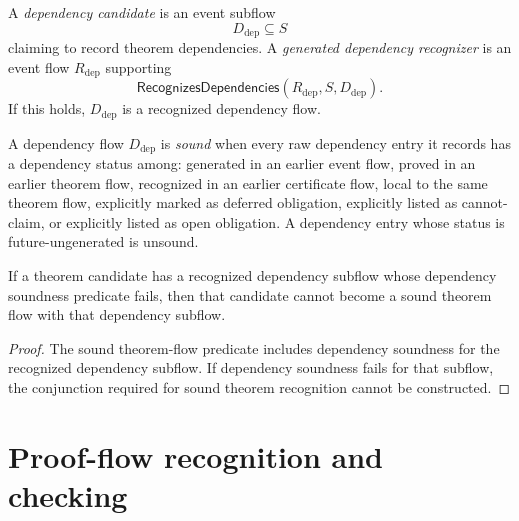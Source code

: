 \begin{definition}
\label{def:theorem-proof-dependency-candidate-recognizer}
A \emph{dependency candidate} is an event subflow
$$
  D_{\mathrm{dep}}\subseteq S
$$
claiming to record theorem dependencies. A \emph{generated dependency recognizer} is an event flow $R_{\mathrm{dep}}$ supporting
$$
  \mathsf{RecognizesDependencies}(R_{\mathrm{dep}},S,D_{\mathrm{dep}}).
$$
If this holds, $D_{\mathrm{dep}}$ is a recognized dependency flow.
\end{definition}

\begin{definition}
\label{def:theorem-proof-dependency-soundness}
A dependency flow $D_{\mathrm{dep}}$ is \emph{sound} when every raw dependency entry it records has a dependency status among: generated in an earlier event flow, proved in an earlier theorem flow, recognized in an earlier certificate flow, local to the same theorem flow, explicitly marked as deferred obligation, explicitly listed as cannot-claim, or explicitly listed as open obligation. A dependency entry whose status is future-ungenerated is unsound.
\end{definition}

\begin{theorem}
\label{thm:theorem-proof-unsound-dependency-blocks}
If a theorem candidate has a recognized dependency subflow whose dependency soundness predicate fails, then that candidate cannot become a sound theorem flow with that dependency subflow.
\end{theorem}

\begin{proof}
The sound theorem-flow predicate includes dependency soundness for the recognized dependency subflow. If dependency soundness fails for that subflow, the conjunction required for sound theorem recognition cannot be constructed.
\end{proof}

\section{Proof-flow recognition and checking}
\label{sec:theorem-proof-proof-flow}

